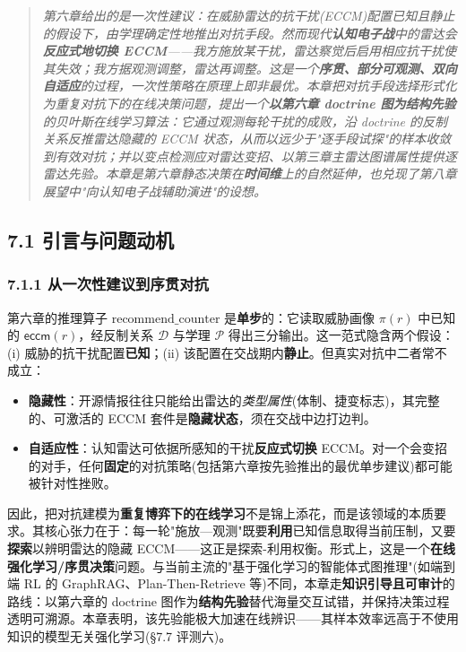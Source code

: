 \documentclass[12pt,a4paper]{ctexart}
\begin{document}
\begin{quote}\itshape 第六章给出的是一次性建议：在威胁雷达的抗干扰(ECCM)配置已知且静止的假设下，由学理确定性地推出对抗手段。然而现代\textbf{认知电子战}中的雷达会\textbf{反应式地切换 ECCM}——我方施放某干扰，雷达察觉后启用相应抗干扰使其失效；我方据观测调整，雷达再调整。这是一个\textbf{序贯、部分可观测、双向自适应}的过程，一次性策略在原理上即非最优。本章把对抗手段选择形式化为重复对抗下的在线决策问题，提出一个\textbf{以第六章 doctrine 图为结构先验}的贝叶斯在线学习算法：它通过观测每轮干扰的成败，沿 doctrine 的反制关系反推雷达隐藏的 ECCM 状态，从而以远少于"逐手段试探"的样本收敛到有效对抗；并以变点检测应对雷达变招、以第三章主雷达图谱属性提供逐雷达先验。本章是第六章静态决策在\textbf{时间维}上的自然延伸，也兑现了第八章展望中"向认知电子战辅助演进"的设想。\end{quote}


\subsection*{7.1 引言与问题动机}

\subsubsection*{7.1.1 从一次性建议到序贯对抗}

第六章的推理算子 $\mathrm{recommend\_counter}$ 是\textbf{单步}的：它读取威胁画像 $\pi(r)$ 中已知的 $\mathsf{eccm}(r)$，经反制关系 $\mathcal{D}$ 与学理 $\mathcal{P}$ 得出三分输出。这一范式隐含两个假设：(i) 威胁的抗干扰配置\textbf{已知}；(ii) 该配置在交战期内\textbf{静止}。但真实对抗中二者常不成立：

\begin{itemize}[leftmargin=2em]
\item \textbf{隐藏性}：开源情报往往只能给出雷达的\textit{类型属性}(体制、捷变标志)，其完整的、可激活的 ECCM 套件是\textbf{隐藏状态}，须在交战中边打边判。
\item \textbf{自适应性}：认知雷达可依据所感知的干扰\textbf{反应式切换} ECCM。对一个会变招的对手，任何\textbf{固定}的对抗策略(包括第六章按先验推出的最优单步建议)都可能被针对性挫败。
\end{itemize}

因此，把对抗建模为\textbf{重复博弈下的在线学习}不是锦上添花，而是该领域的本质要求。其核心张力在于：每一轮"施放—观测"既要\textbf{利用}已知信息取得当前压制，又要\textbf{探索}以辨明雷达的隐藏 ECCM——这正是探索-利用权衡。形式上，这是一个\textbf{在线强化学习/序贯决策}问题。与当前主流的"基于强化学习的智能体式图推理"(如端到端 RL 的 GraphRAG、Plan-Then-Retrieve 等)不同，本章走\textbf{知识引导且可审计}的路线：以第六章的 doctrine 图作为\textbf{结构先验}替代海量交互试错，并保持决策过程透明可溯源。本章表明，该先验能极大加速在线辨识——其样本效率远高于不使用知识的模型无关强化学习(§7.7 评测六)。
\end{document}
